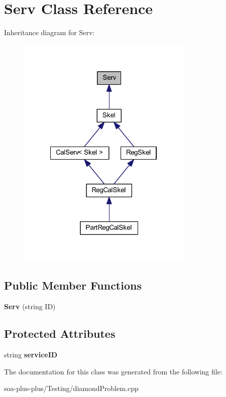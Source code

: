 \hypertarget{class_serv}{
\section{Serv Class Reference}
\label{class_serv}
}


Inheritance diagram for Serv:\nopagebreak
\begin{figure}[H]
\begin{center}
\leavevmode
\includegraphics[width=237pt]{class_serv__inherit__graph}
\end{center}
\end{figure}
\subsection*{Public Member Functions}
\begin{DoxyCompactItemize}
\item 
\hypertarget{class_serv_af1b383a77fb2b41a465d266d9c8c9072}{
{\bfseries Serv} (string ID)}
\label{class_serv_af1b383a77fb2b41a465d266d9c8c9072}

\end{DoxyCompactItemize}
\subsection*{Protected Attributes}
\begin{DoxyCompactItemize}
\item 
\hypertarget{class_serv_a5c339631b3b7cc11b67e0153e37223bd}{
string {\bfseries serviceID}}
\label{class_serv_a5c339631b3b7cc11b67e0153e37223bd}

\end{DoxyCompactItemize}


The documentation for this class was generated from the following file:\begin{DoxyCompactItemize}
\item 
soa-\/plus-\/plus/Testing/diamondProblem.cpp\end{DoxyCompactItemize}
